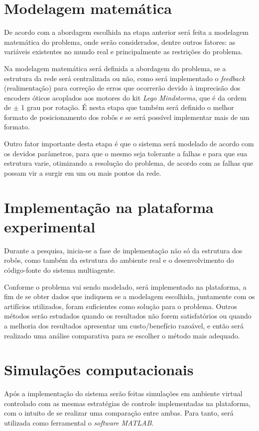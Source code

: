 \section{Modelagem matemática}

De acordo com a abordagem escolhida na etapa anterior será feita a modelagem matemática do problema, onde serão considerados, dentre outros fatores: as variáveis existentes no mundo real e principalmente as restrições do problema. 

Na modelagem matemática será definida a abordagem do problema, se a estrutura da rede será centralizada ou não, como será implementado o \emph{feedback} (realimentação) para correção de erros que ocorrerão devido à imprecisão dos encoders óticos acoplados aos motores do kit \emph{Lego Mindstorms\textregistered}, que é da ordem de $\pm$ 1 grau por rotação. %
É nesta etapa que também será definido o melhor formato de posicionamento dos robôs e se será possível implementar mais de um formato. 

Outro fator importante desta etapa é que o sistema será modelado de acordo com os devidos parâmetros, para que o mesmo seja tolerante a falhas e para que sua estrutura varie, otimizando a resolução do problema, de acordo com as falhas que possam vir a surgir em um ou mais pontos da rede.

\section{Implementação na plataforma experimental}
Durante a pesquisa, inicia-se a fase de implementação não só da estrutura dos robôs, como também da estrutura do ambiente real e o desenvolvimento do código-fonte do sistema multiagente. 

Conforme o problema vai sendo modelado, será implementado na plataforma, a fim de se obter dados que indiquem se a modelagem escolhida, juntamente com os artifícios utilizados, foram suficientes como solução para o problema. Outros métodos serão estudados quando os resultados não forem satisfatórios ou quando a melhoria dos resultados apresentar um custo/benefício razoável, e então será realizado uma análise comparativa para se escolher o método mais adequado.

\section{Simulações computacionais}

Após a implementação do sistema serão feitas simulações em ambiente virtual controlado com as mesmas estratégias de controle implementadas na plataforma, com o intuito de se realizar uma comparação entre ambas. Para tanto, será utilizada como ferramental o \emph{software MATLAB\textregistered}.

